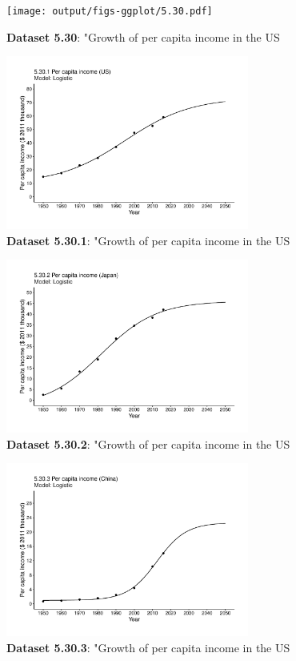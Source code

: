 \documentclass[aps,rmp,preprint,superscriptaddress,10pt,onecolumn]{article}
\begin{document}
\begin{figure}[h]
\texttt{[image: output/figs-ggplot/5.30.pdf]}
\caption{\textbf{Dataset 5.30}: "Growth of per capita income in the US}
\end{figure}
	
\begin{figure}[h]
\includegraphics[width=8cm]{output/figs-ggplot/5.30.1.pdf}
\caption{\textbf{Dataset 5.30.1}: "Growth of per capita income in the US}
\end{figure}
	
\begin{figure}[h]
\includegraphics[width=8cm]{output/figs-ggplot/5.30.2.pdf}
\caption{\textbf{Dataset 5.30.2}: "Growth of per capita income in the US}
\end{figure}
	
\begin{figure}[h]
\includegraphics[width=8cm]{output/figs-ggplot/5.30.3.pdf}
\caption{\textbf{Dataset 5.30.3}: "Growth of per capita income in the US}
\end{figure}
	
\end{document}
